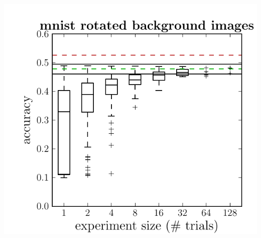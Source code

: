\documentclass[12pt]{scrartcl}
\begin{document}
\includegraphics[scale=0.40]{figures/dbn_efficiency/dbn_efficiency_mnist_rotated_background_images}
\end{document}
